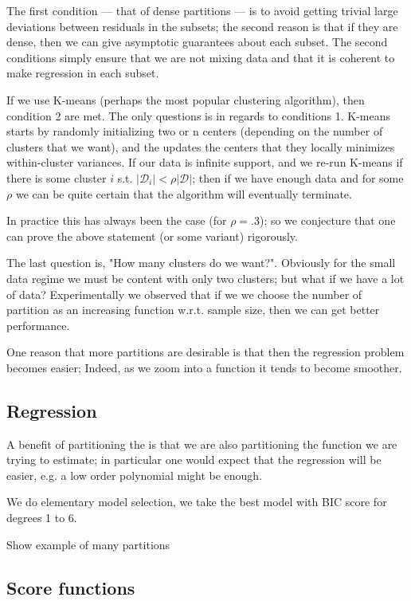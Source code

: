 The first condition ---  that of dense partitions ---  is to avoid getting trivial large deviations between residuals 
in the subsets; the second reason is that if they are dense, then we can give asymptotic guarantees about each subset.
The second conditions simply ensure that we are not mixing data and that it is coherent to make regression
in each subset. 

If we use K-means (perhaps the most popular clustering algorithm), then condition 2 are met. The only 
questions is in regards to conditions 1. K-means starts by randomly initializing two or n centers (depending 
on the number of clusters that we want), and the updates the centers that they locally 
minimizes within-cluster variances. If our data is infinite support, and we re-run K-means if there is some cluster
$i$ s.t. $|\mathcal{D}_i| < \rho |\mathcal{D}|$; then if we have enough data and for some $\rho$ we can be quite 
certain that the algorithm will eventually terminate. 

In practice this has always been the case (for $\rho = .3$); so we conjecture that one can prove the above statement 
(or some variant) rigorously. 

The last question is, "How many clusters do we want?". Obviously for the small data regime we must be content 
with only two clusters; but what if we have a lot of data? Experimentally we observed that if we 
we choose the number of partition as an increasing function w.r.t. sample size, then we can get better performance.

One reason that more partitions are desirable is that then the regression problem becomes easier; Indeed, as we 
zoom into a function it tends to become smoother.


\subsection{Regression}

A benefit of partitioning the is that we are also partitioning the function we are trying to estimate; in 
particular one would expect that the regression will be easier, e.g. a low order polynomial might be enough.

We do elementary model selection, we take the best model with BIC score for degrees 1 to 6. 

Show example of many partitions

\subsection{Score functions}

